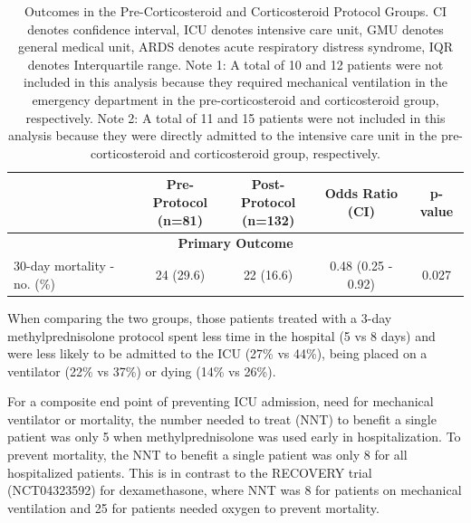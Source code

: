 \documentclass[Minh_PhD_thesis.tex]{subfiles}
\begin{document}
\begin{table}
\footnotesize
\caption{Outcomes in the Pre-Corticosteroid and Corticosteroid Protocol Groups. CI denotes confidence interval, ICU denotes intensive care unit, GMU denotes general medical unit, ARDS denotes acute respiratory distress syndrome, IQR denotes Interquartile range. Note 1: A total of 10 and 12 patients were not included in this analysis because they required mechanical ventilation in the emergency department in the pre-corticosteroid and corticosteroid group, respectively. Note 2: A total of 11 and 15 patients were not included in this analysis because they were directly admitted to the intensive care unit in the pre-corticosteroid and corticosteroid group, respectively.}
\begin{center}
\begin{tabular}{p{6.5cm} cccc}
\hline
&\makecell{\textbf{Pre-Protocol}\\ \textbf{(n=81)}}	&\makecell{\textbf{Post-Protocol}\\ \textbf{(n=132)}}	&\textbf{Odds Ratio (CI)}	& \textbf{p-value}\\
\hline
\multicolumn{5}{c}{\textbf{Primary Outcome }}\\
\hline
30-day mortality - no. (\%)	& 24 (29.6)	& 22 (16.6)	&0.48 (0.25 - 0.92)	&0.027\\

\hline
\end{tabular}
\end{center}
\label{endpoints}
\end{table}%


When comparing the two groups, those patients treated with a 3-day methylprednisolone protocol spent less time in the hospital (5 vs 8 days) and were less likely to be admitted to the ICU (27\% vs 44\%), being placed on a ventilator (22\% vs 37\%) or dying (14\% vs 26\%).

For a composite end point of preventing ICU admission, need for mechanical ventilator or mortality, the number needed to treat (NNT) to benefit a single patient was only 5 when methylprednisolone was used early in hospitalization. To prevent mortality, the NNT to benefit a single patient was only 8 for all hospitalized patients. This is in contrast to the RECOVERY trial (NCT04323592) for dexamethasone, where NNT was 8 for patients on mechanical ventilation and 25 for patients needed oxygen to prevent mortality.
\color{black}
\end{document}
